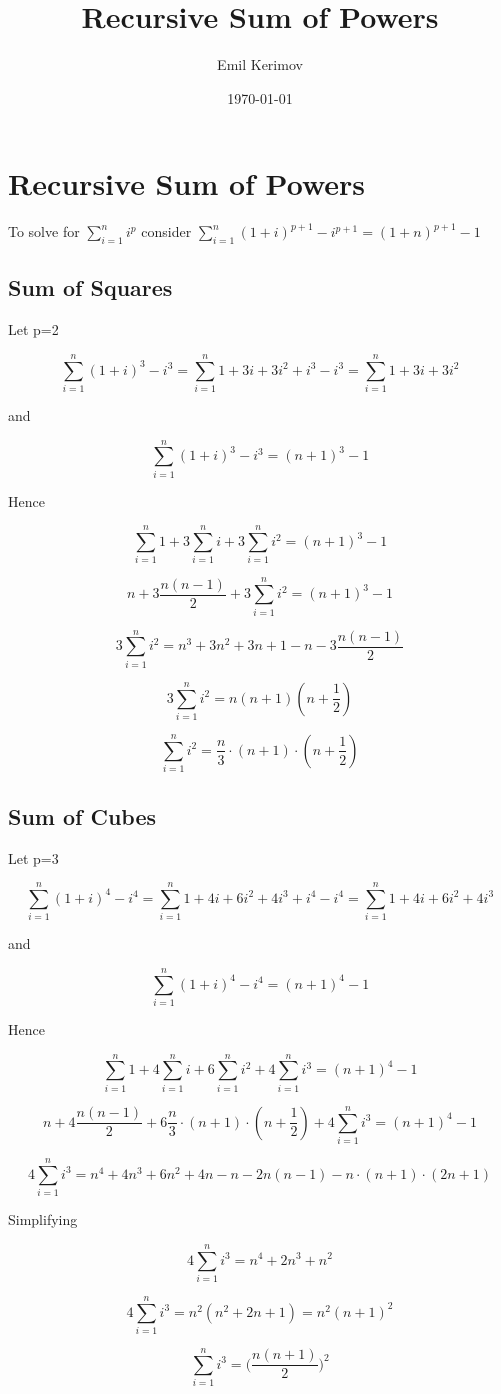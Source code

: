 \documentclass[a4paper]{article}
\title{Recursive Sum of Powers}
\author{Emil Kerimov}
\date{\today}
\begin{document}
\maketitle

\section{Recursive Sum of Powers}
\label{rsp:Recursive sum of powers}

To solve for $\sum\limits_{i=1}^{n} i^{p}$ consider $\sum\limits_{i=1}^{n} {(1+i)^{p+1} - i^{p+1}} = (1+n)^{p+1} - 1$

\subsection{Sum of Squares}

Let p=2

$$\sum\limits_{i=1}^{n} (1+i)^3 - i^3 = \sum\limits_{i=1}^{n} 1+3i+3i^2 +i^3 - i^3 = \sum\limits_{i=1}^{n} 1+3i+3i^2$$

and 

$$\sum\limits_{i=1}^{n} (1+i)^3 - i^3 = (n+1)^3 - 1$$

Hence

$$\sum\limits_{i=1}^{n} 1+ 3\sum\limits_{i=1}^{n}i+3\sum\limits_{i=1}^{n}i^2 =(n+1)^3 - 1$$

$$n+3\frac{n(n-1)}{2}+3\sum\limits_{i=1}^{n}i^2 =(n+1)^3 - 1$$


$$3\sum\limits_{i=1}^{n}i^2 = n^3 + 3n^2 + 3n + 1 - n - 3\frac{n(n-1)}{2}$$


$$3\sum\limits_{i=1}^{n}i^2 = n(n+1)(n+\frac{1}{2})$$


$$
\boxed{
\sum\limits_{i=1}^{n}i^2 = \frac{n}{3} \cdot (n+1) \cdot (n+\frac{1}{2})
}
$$

\subsection{Sum of Cubes}

Let p=3

$$\sum\limits_{i=1}^{n} (1+i)^4 - i^4 = \sum\limits_{i=1}^{n} 1+4i+6i^2 + 4i^3 +i^4 - i^4 = \sum\limits_{i=1}^{n} 1+4i+6i^2 + 4i^3$$

and 

$$\sum\limits_{i=1}^{n} (1+i)^4 - i^4 = (n+1)^4 - 1$$

Hence

$$\sum\limits_{i=1}^{n} 1+ 4\sum\limits_{i=1}^{n}i + 6\sum\limits_{i=1}^{n}i^2
+ 4\sum\limits_{i=1}^{n}i^3 =(n+1)^4 - 1$$

$$n+4\frac{n(n-1)}{2}+6 \frac{n}{3} \cdot (n+1) \cdot (n+\frac{1}{2}) + 4\sum\limits_{i=1}^{n}i^3 =(n+1)^4 - 1$$


$$4\sum\limits_{i=1}^{n}i^3 = n^4 + 4n^3 + 6n^2 + 4n - n - 2n(n-1) - n\cdot (n+1) \cdot (2n+1)$$

Simplifying

$$4\sum\limits_{i=1}^{n}i^3 = n^4 + 2n^3 + n^2 $$

$$4\sum\limits_{i=1}^{n}i^3 = n^2 (n^2 + 2n + 1) = n^2(n+1)^2$$

$$
\boxed{
\sum\limits_{i=1}^{n}i^3 = \Big( \frac{n(n+1)}{2} \Big)^2
}
$$
\end{document}
